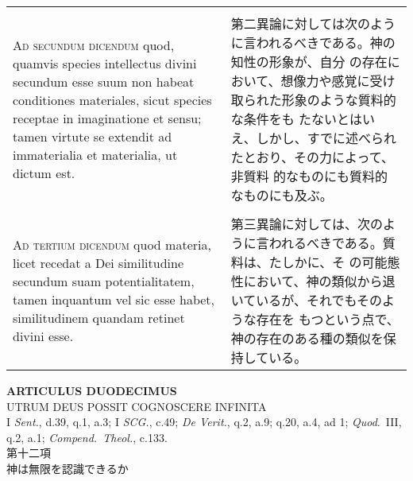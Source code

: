 \documentclass[10pt]{jsarticle} %
\begin{document}
\begin{longtable}{p{21em}p{21em}}
\\
\\

{\scshape Ad secundum dicendum} quod, quamvis species intellectus
divini secundum esse suum non habeat conditiones materiales, sicut
species receptae in imaginatione et sensu; tamen virtute se extendit
ad immaterialia et materialia, ut dictum est.


&

第二異論に対しては次のように言われるべきである。神の知性の形象が、自分
の存在において、想像力や感覚に受け取られた形象のような質料的な条件をも
たないとはいえ、しかし、すでに述べられたとおり、その力によって、非質料
的なものにも質料的なものにも及ぶ。


\\
\\

{\scshape Ad tertium dicendum} quod materia, licet recedat a Dei
similitudine secundum suam potentialitatem, tamen inquantum vel sic
esse habet, similitudinem quandam retinet divini esse.


&

第三異論に対しては、次のように言われるべきである。質料は、たしかに、そ
の可能態性において、神の類似から退いているが、それでもそのような存在を
もつという点で、神の存在のある種の類似を保持している。




\end{longtable}
\newpage


\begin{center}
{\Large {\bf ARTICULUS DUODECIMUS}}\\ {\large UTRUM DEUS POSSIT
COGNOSCERE INFINITA}\\ {\footnotesize I {\itshape Sent.}, d.39, q.1,
a.3; I {\itshape SCG.}, c.49; {\itshape De Verit.}, q.2, a.9;
q.20, a.4, ad 1; {\itshape Quod}.~III, q.2, a.1; {\itshape
Compend.~Theol.}, c.133.}\\ {\Large 第十二項\\神は無限を認識できるか}
\end{center}
\end{document}
